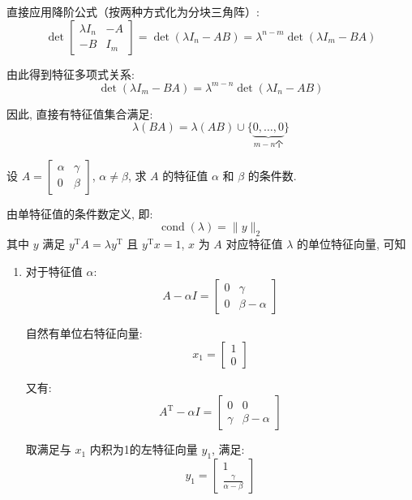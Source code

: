 \documentclass[12pt, answers]{exam}     %
\newcommand{\T}{\mathrm{T}}
\begin{document}
\begin{questions}
\begin{solution}
直接应用降阶公式（按两种方式化为分块三角阵）: 
\[
\det\begin{bmatrix}
\lambda I_n & -A \\
-B & I_m
\end{bmatrix} = \det(\lambda I_n - AB) = \lambda^{n-m}\det(\lambda I_m - BA)
\]

由此得到特征多项式关系: 
\[
\det(\lambda I_m - BA) = \lambda^{m-n} \det(\lambda I_n - AB)
\]

因此, 直接有特征值集合满足: 
\[
\lambda(BA) = \lambda(AB) \cup \{\underbrace{0, \ldots, 0}_{m-n \text{个}}\}
\]
\end{solution}


\question{}设 \( A = \begin{bmatrix} \alpha & \gamma \\ 0 & \beta \end{bmatrix} \), \(\alpha \neq \beta\), 
求 \(A\) 的特征值 \(\alpha\) 和 \(\beta\) 的条件数. 

\begin{solution}
由单特征值的条件数定义, 即:
\[
\operatorname{cond}(\lambda) = \|y\|_{2}
\]
其中 $ y $ 满足 $ y^{\T}A = \lambda y^{\T} $ 且 $ y^{\T}x = 1 $, \(x\) 为 \(A\) 对应特征值 $ \lambda $ 的单位特征向量, 可知

\begin{enumerate}
    \item 对于特征值 \(\alpha\):
    \[
    A - \alpha I = \begin{bmatrix} 
    0 & \gamma \\ 
    0 & \beta - \alpha 
    \end{bmatrix}
    \]
    
    自然有单位右特征向量:
    \[ 
    x_1 = \begin{bmatrix} 1 \\ 0 \end{bmatrix}
    \]
    
    又有:
    \[
    A^{\T} - {\alpha} I = \begin{bmatrix} 
    0 & 0 \\ 
    {\gamma} & {\beta} - {\alpha} 
    \end{bmatrix}
    \]
    
    取满足与 $ x_1 $ 内积为1的左特征向量 \( y_1 \), 满足:
    \[ 
    y_1 = \begin{bmatrix} 1 \\ \frac{\gamma}{\alpha - \beta} \end{bmatrix}
    \]
    

\end{enumerate}
\end{solution}
\end{questions}
\end{document}
